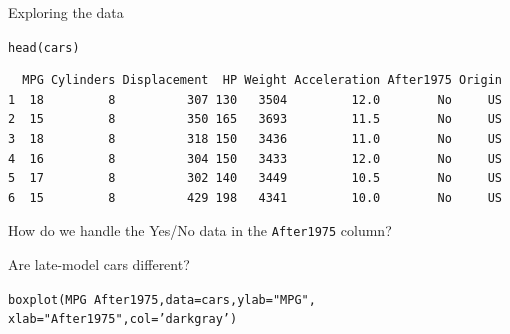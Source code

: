 \documentclass{beamer}\usepackage[]{graphicx}\usepackage[]{color}
\makeatletter
\newcommand{\hlnum}[1]{\textcolor[rgb]{0.824,0.412,0.118}{#1}}%
\newcommand{\hlstr}[1]{\textcolor[rgb]{1,0.894,0.71}{#1}}%
\newcommand{\hlopt}[1]{\textcolor[rgb]{1,0.894,0.769}{#1}}%
\newcommand{\hlstd}[1]{\textcolor[rgb]{1,0.894,0.769}{#1}}%
\newcommand{\hlkwb}[1]{\textcolor[rgb]{0.804,0.776,0.451}{#1}}%
\newcommand{\hlkwc}[1]{\textcolor[rgb]{0.78,0.941,0.545}{#1}}%
\newcommand{\hlkwd}[1]{\textcolor[rgb]{1,0.78,0.769}{#1}}%
\newenvironment{kframe}{%
 \def\at@end@of@kframe{}%
 \ifinner\ifhmode%
  \def\at@end@of@kframe{\end{minipage}}%
  \begin{minipage}{\columnwidth}%
 \fi\fi%
 \def\FrameCommand##1{\hskip\@totalleftmargin \hskip-\fboxsep
 \colorbox{shadecolor}{##1}\hskip-\fboxsep
     \hskip-\linewidth \hskip-\@totalleftmargin \hskip\columnwidth}%
 \MakeFramed {\advance\hsize-\width
   \@totalleftmargin\z@ \linewidth\hsize
   \@setminipage}}%
 {\par\unskip\endMakeFramed%
 \at@end@of@kframe}
\newenvironment{knitrout}{}{} %
\makeatother
\begin{document}
\begin{darkframes}
    \begin{frame}[fragile]{Exploring the data}
      \fontsm
\begin{knitrout}
\begin{kframe}
\begin{alltt}
\hlkwd{head}\hlstd{(cars)}
\end{alltt}
\begin{verbatim}
  MPG Cylinders Displacement  HP Weight Acceleration After1975 Origin
1  18         8          307 130   3504         12.0        No     US
2  15         8          350 165   3693         11.5        No     US
3  18         8          318 150   3436         11.0        No     US
4  16         8          304 150   3433         12.0        No     US
5  17         8          302 140   3449         10.5        No     US
6  15         8          429 198   4341         10.0        No     US
\end{verbatim}
\end{kframe}
\end{knitrout}
      \pause
      How do we handle the Yes/No data in the \texttt{After1975} column?
    \end{frame}


    \begin{frame}[fragile]{Are late-model cars different?}
\begin{knitrout}
\begin{kframe}
\begin{alltt}
\hlkwd{boxplot}\hlstd{(MPG} \hlopt{~} \hlstd{After1975,} \hlkwc{data}\hlstd{=cars,} \hlkwc{ylab}\hlstd{=}\hlstr{"MPG"}\hlstd{,}
              \hlkwc{xlab}\hlstd{=}\hlstr{"After 1975"}\hlstd{,} \hlkwc{col}\hlstd{=}\hlstr{'darkgray'}\hlstd{)}
\end{alltt}
\end{kframe}


\end{knitrout}
    \end{frame}



\end{darkframes}
\end{document}
